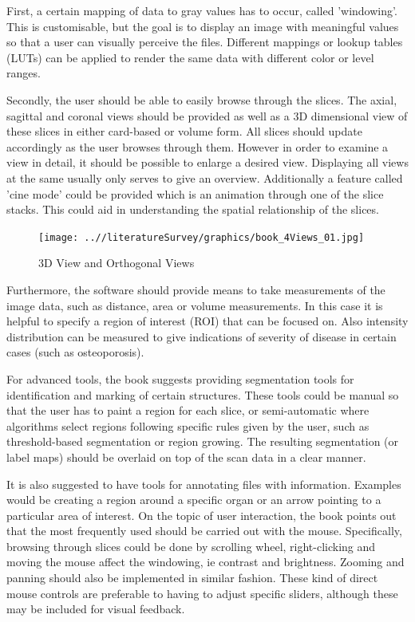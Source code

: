\documentclass[a4paper,11pt,titlepage]{article}
\begin{document}
First, a certain mapping of data to gray values has to occur, called 'windowing'. This is customisable, but the goal is to display an image with meaningful values so that a user can visually perceive the files. Different mappings or lookup tables (LUTs) can be applied to render the same data with different color or level ranges.

Secondly, the user should be able to easily browse through the slices. The axial, sagittal and coronal views should be provided as well as a 3D dimensional view of these slices in either card-based or volume form. All slices should update accordingly as the user browses through them. However in order to examine a view in detail, it should be possible to enlarge a desired view. Displaying all views at the same usually only serves to give an overview. Additionally a feature called 'cine mode' could be provided which is an animation through one of the slice stacks. This could aid in understanding the spatial relationship of the slices.



\begin{figure}[ht!]
\centering
\texttt{[image: ..//literatureSurvey/graphics/book\_4Views\_01.jpg]}
\caption{3D View and Orthogonal Views}
\label{fig:UIdesign1}
\end{figure}

Furthermore, the software should provide means to take measurements of the image data, such as distance, area or volume measurements. In this case it is helpful to specify a region of interest (ROI) that can be focused on. Also intensity distribution can be measured to give indications of severity of disease in certain cases (such as osteoporosis)\cite{book}.

For advanced tools, the book suggests providing segmentation tools for identification and marking of certain structures. These tools could be manual so that the user has to paint a region for each slice, or semi-automatic where algorithms select regions following specific rules given by the user, such as threshold-based segmentation or region growing. The resulting segmentation (or label maps) should be overlaid on top of the scan data in a clear manner.

It is also suggested to have tools for annotating files with information. Examples would be creating a region around a specific organ or an arrow pointing to a particular area of interest.
On the topic of user interaction, the book points out that the most frequently used should be carried out with the mouse. Specifically, browsing through slices could be done by scrolling wheel, right-clicking and moving the mouse affect the windowing, ie contrast and brightness. Zooming and panning should also be implemented in similar fashion. These kind of direct mouse controls are preferable to having to adjust specific sliders, although these may be included for visual feedback.
\end{document}
